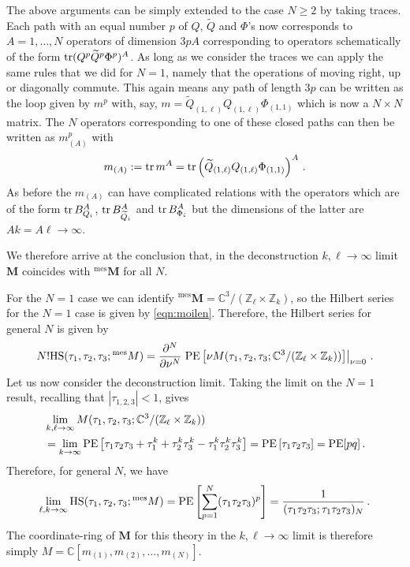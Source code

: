 \documentclass[main.tex]{subfiles}
\begin{document}
The above arguments can be simply extended to the case $N\geq2$ by taking traces. Each path with an equal number $p$ of $Q$, $\widetilde{Q}$ and $\Phi$'s now corresponds to $A=1,\dots,N$ operators of dimension $3pA$ corresponding to operators schematically of the form $\operatorname{tr} (Q^p\widetilde{Q}^p\Phi^p)^A$. As long as we consider the traces we can apply the same rules that we did for $N=1$, namely that the operations of moving right, up or diagonally commute. This again means any path of length $3p$ can be written as the loop given by $m^p$ with, say, $m=\widetilde{Q}_{(1,\ell)}Q_{(1,\ell)}\Phi_{(1,1)}$ which is now a $N\times N$ matrix. The $N$ operators corresponding to one of these closed paths can then be written  as $m_{(A)}^p$ with
\begin{equation}
m_{(A)}:=\operatorname{tr} m^A=\operatorname{tr}\left(\widetilde{Q}_{(1,\ell)}Q_{(1,\ell)}\Phi_{(1,1)}\right)^A\,.
\end{equation}
As before the $m_{(A)}$ can have complicated relations with the operators which are of the form $\operatorname{tr} B_{Q_i}^A$, $\operatorname{tr} B_{\widetilde{Q}_i}^A$ and $\operatorname{tr} B^A_{\Phi_i}$ but the dimensions of the latter are $Ak=A\ell\to\infty$. 

We therefore arrive at the conclusion that, in the deconstruction $k,\ell\to\infty$ limit $\mathbf{M}$ coincides with ${}^{\text{mes}}\mathbf{M}$ for all $N$.

For the $N=1$ case we can identify ${}^{\text{mes}}\mathbf{M}=\mathbb{C}^3/(\mathbb{Z}_{\ell}\times\mathbb{Z}_k)$, so the Hilbert series for the $N=1$ case is given by \eqref{eqn:moilen}. Therefore, the Hilbert series for general $N$ is given by
\begin{equation}
\label{eq:hsg}
N!\textrm{HS}(\tau_1,\tau_2,\tau_3;{}^{\text{mes}}M) = \frac{\partial^{N}}{\partial\nu^{N}}\left.\operatorname{\mathrm{PE}}\left[\nu M(\tau_1,\tau_2,\tau_3;\mathbb{C}^3/(\mathbb{Z}_{\ell}\times\mathbb{Z}_k))\right]\right|_{\nu=0}\, .
\end{equation}
Let us now consider the deconstruction limit. Taking the limit on the $N=1$ result, recalling that $|\tau_{1,2,3}|<1$, gives
\begin{equation}
\begin{aligned}
&\lim_{k,\ell\to\infty}M(\tau_1,\tau_2,\tau_3;\mathbb{C}^3/(\mathbb{Z}_{\ell}\times\mathbb{Z}_k))\\
&=\lim_{k\to\infty}\operatorname{\mathrm{PE}}\left[\tau_1\tau_2\tau_3+\tau_1^k+\tau_2^k\tau_3^k-\tau_1^k\tau_2^k\tau_3^k\right]=\operatorname{\mathrm{PE}}\left[\tau_1\tau_2\tau_3\right]=\operatorname{\mathrm{PE}}[pq]\,.
\end{aligned}
\end{equation}
Therefore, for general $N$, we have
\begin{equation}\label{eqn:decon4d}
\lim_{\ell,k \to\infty}\textrm{HS}(\tau_1,\tau_2,\tau_3;{}^{\text{mes}}M)= \operatorname{\mathrm{PE}}\left[\sum_{p=1}^{N}(\tau_1\tau_2\tau_3)^{p}\right]=\frac{1}{(\tau_1\tau_2\tau_3;\tau_1\tau_2\tau_3)_N} \, .
\end{equation}
The coordinate-ring of $\mathbf{M}$ for this theory in the $k,\ell\to\infty$ limit is therefore simply $M=\mathbb{C}[m_{(1)},m_{(2)},\dots,m_{(N)}]$.
\end{document}
